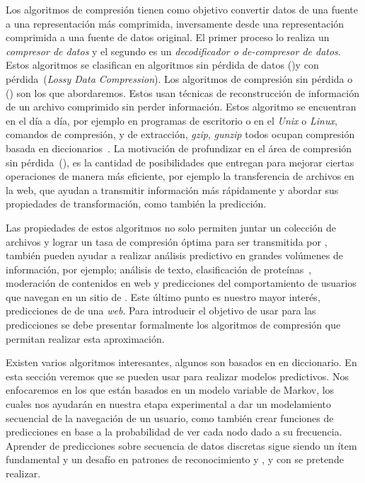 Los algoritmos de compresión tienen como objetivo convertir datos de una fuente a una representación más comprimida, inversamente desde una representación comprimida a una fuente de datos original. El primer proceso lo realiza un \emph{compresor de datos} y el segundo es un \emph{decodificador o de-compresor de datos}. Estos algoritmos se clasifican en algoritmos sin pérdida de datos (\losslessdatacompression)y con pérdida~(\emph{Lossy Data Compression}). Los algoritmos de compresión sin pérdida o  \losslessdatacompression(\LDC) son los que abordaremos. Estos usan técnicas de reconstrucción de información de un archivo comprimido sin perder información. Estos algoritmo se encuentran en el día a día, por ejemplo en programas de escritorio o en el \emph{Unix} o \emph{Linux}, comandos de compresión, y de extracción, \emph{gzip}, \emph{gunzip} todos ocupan compresión basada en diccionarios~\cite{MengyiPu2006}. La motivación de profundizar en el área de compresión sin pérdida~(\LDC), es la cantidad de posibilidades que entregan para mejorar ciertas operaciones de manera más eficiente, por ejemplo la  transferencia de archivos en la web, que ayudan a transmitir información más rápidamente y abordar sus propiedades de transformación, como también la predicción.


Las propiedades de estos algoritmos no solo permiten juntar un colección de archivos y lograr un tasa de compresión óptima para ser transmitida por \inet, también pueden ayudar a realizar análisis predictivo en grandes volúmenes de información, por ejemplo; análisis de texto, clasificación de proteínas~\cite{}, moderación de contenidos en web y predicciones del comportamiento de usuarios que navegan en un sitio de \inet. Este último punto es nuestro mayor interés, predicciones de \webasccesslog de una \emph{web}. Para introducir el objetivo de usar \LDC para las predicciones se debe presentar formalmente los algoritmos de compresión que permitan realizar esta aproximación.

Existen varios algoritmos \losslessdatacompression interesantes, algunos son basados en en diccionario. En esta sección veremos que se pueden usar para realizar modelos predictivos. Nos enfocaremos en los que están basados en un modelo variable de Markov, los cuales nos ayudarán en nuestra etapa experimental a dar un modelamiento secuencial de la navegación de un usuario, como también crear funciones de predicciones en base a la probabilidad de ver cada nodo dado a su frecuencia. Aprender de predicciones sobre secuencia de datos discretas sigue siendo un ítem fundamental y un desafío en patrones de reconocimiento y \machinelearning, y con \LDC se pretende realizar.














